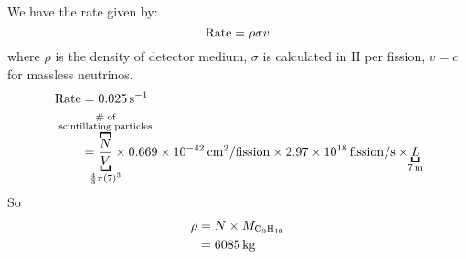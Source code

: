 \begin{parts}
\begin{subparts}
		\subpart {}
		We have the rate given by:
		\begin{equation*}
			\textnormal{Rate} = \rho \sigma v
		\end{equation*}
		where $\rho$ is the density of detector medium, $\sigma$ is calculated in II per fission, $v=c$ for massless neutrinos.
		\begin{align*}
			\textnormal{Rate} &= \SI{0.025}{\per\second} \\
			&= \frac{\overbracket{N}^{\mathclap{\substack{\textnormal{\# of}\\\textnormal{scintillating particles}}}}}{\underbracket{V}_{\mathclap{\frac{4}{3}\pi(7)^3}}} \times \SI{0.669e-42}{\centi\metre\squared\per fission} \times \SI{2.97e18}{fission \per\second} \times \underbracket{L}_{\mathclap{\SI{7}{\metre}}}
		\end{align*}
		So
		\begin{align*}
			\rho &= N \times M_{\textnormal{C\textsubscript{9}H\textsubscript{10}}} \\
			&= \SI{6085}{\kilo\gram}
		\end{align*}
	\end{subparts}
\end{parts}